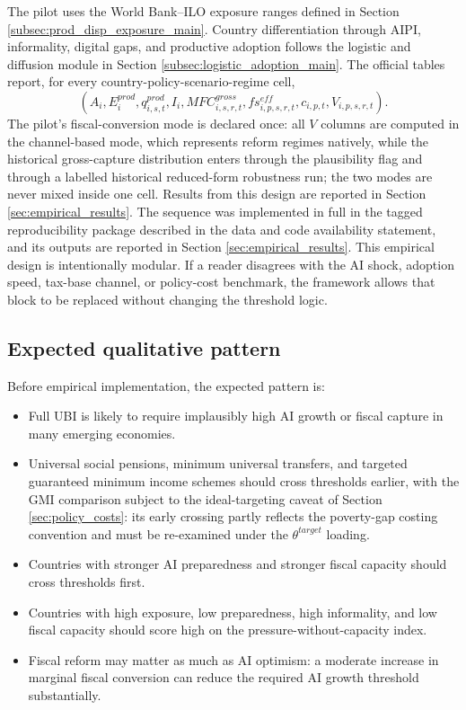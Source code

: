 \documentclass[11pt,a4paper]{article}
\begin{document}
The pilot uses the World Bank--ILO exposure ranges defined in Section \ref{subsec:prod_disp_exposure_main}. Country differentiation through AIPI, informality, digital gaps, and productive adoption follows the logistic and diffusion module in Section \ref{subsec:logistic_adoption_main}.
The official tables report, for every country-policy-scenario-regime cell,
\begin{equation}
    \left(A_i,E^{prod}_i,q^{prod}_{i,s,t},I_i,MFC^{gross}_{i,s,r,t},fs^{eff}_{i,p,s,r,t},c_{i,p,t},V_{i,p,s,r,t}\right).
\end{equation}
The pilot's fiscal-conversion mode is declared once: all $V$ columns are computed in the channel-based mode, which represents reform regimes natively, while the historical gross-capture distribution enters through the plausibility flag and through a labelled historical reduced-form robustness run; the two modes are never mixed inside one cell. Results from this design are reported in Section \ref{sec:empirical_results}.
The sequence was implemented in full in the tagged reproducibility package described in the data and code availability statement, and its outputs are reported in Section \ref{sec:empirical_results}.
This empirical design is intentionally modular. If a reader disagrees with the AI shock, adoption speed, tax-base channel, or policy-cost benchmark, the framework allows that block to be replaced without changing the threshold logic.

\subsection{Expected qualitative pattern}\label{sec:expected}

Before empirical implementation, the expected pattern is:
\begin{itemize}
    \item Full UBI is likely to require implausibly high AI growth or fiscal capture in many emerging economies.
    \item Universal social pensions, minimum universal transfers, and targeted guaranteed minimum income schemes should cross thresholds earlier, with the GMI comparison subject to the ideal-targeting caveat of Section \ref{sec:policy_costs}: its early crossing partly reflects the poverty-gap costing convention and must be re-examined under the $\theta^{target}$ loading.
    \item Countries with stronger AI preparedness and stronger fiscal capacity should cross thresholds first.
    \item Countries with high exposure, low preparedness, high informality, and low fiscal capacity should score high on the pressure-without-capacity index.
    \item Fiscal reform may matter as much as AI optimism: a moderate increase in marginal fiscal conversion can reduce the required AI growth threshold substantially.
\end{itemize}
\end{document}
